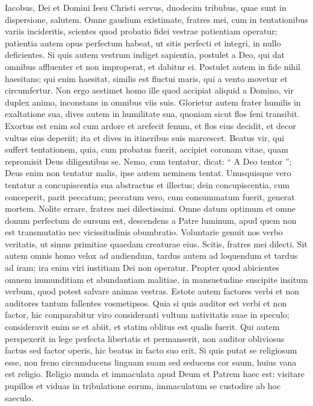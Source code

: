 \begin{biblechapter}
 \verse Iacobus, Dei et Domini Iesu Christi servus, duodecim tribubus, quae sunt in dispersione, salutem.
 \verse Omne gaudium existimate, fratres mei, cum in tentationibus variis incideritis, 
\verse scientes quod probatio fidei vestrae patientiam operatur; 
\verse patientia autem opus perfectum habeat, ut sitis perfecti et integri, in nullo deficientes.
 \verse Si quis autem vestrum indiget sapientia, postulet a Deo, qui dat omnibus affluenter et non improperat, et dabitur ei. 
\verse Postulet autem in fide nihil haesitans; qui enim haesitat, similis est fluctui maris, qui a vento movetur et circumfertur. 
\verse Non ergo aestimet homo ille quod accipiat aliquid a Domino, 
 \verse vir duplex animo, inconstans in omnibus viis suis.
 \verse Glorietur autem frater humilis in exaltatione sua, 
\verse dives autem in humilitate sua, quoniam sicut flos feni transibit. 
\verse Exortus est enim sol cum ardore et arefecit fenum, et flos eius decidit, et decor vultus eius deperiit; ita et dives in itineribus suis marcescet. 
\verse Beatus vir, qui suffert tentationem, quia, cum probatus fuerit, accipiet coronam vitae, quam repromisit Deus diligentibus se.
 \verse Nemo, cum tentatur, dicat: “ A Deo tentor ”; Deus enim non tentatur malis, ipse autem neminem tentat. 
\verse Unusquisque vero tentatur a concupiscentia sua abstractus et illectus; 
\verse dein concupiscentia, cum conceperit, parit peccatum; peccatum vero, cum consummatum fuerit, generat mortem.
 \verse Nolite errare, fratres mei dilectissimi. 
\verse Omne datum optimum et omne donum perfectum de sursum est, descendens a Patre luminum, apud quem non est transmutatio nec vicissitudinis obumbratio. 
\verse Voluntarie genuit nos verbo veritatis, ut simus primitiae quaedam creaturae eius. 
\verse Scitis, fratres mei dilecti. Sit autem omnis homo velox ad audiendum, tardus autem ad loquendum et tardus ad iram; 
\verse ira enim viri iustitiam Dei non operatur. 
\verse Propter quod abicientes omnem immunditiam et abundantiam malitiae, in mansuetudine suscipite insitum verbum, quod potest salvare animas vestras. 
\verse Estote autem factores verbi et non auditores tantum fallentes vosmetipsos. 
\verse Quia si quis auditor est verbi et non factor, hic comparabitur viro consideranti vultum nativitatis suae in speculo; 
\verse consideravit enim se et abiit, et statim oblitus est qualis fuerit. 
\verse Qui autem perspexerit in lege perfecta libertatis et permanserit, non auditor obliviosus factus sed factor operis, hic beatus in facto suo erit.
 \verse Si quis putat se religiosum esse, non freno circumducens linguam suam sed seducens cor suum, huius vana est religio. 
\verse Religio munda et immaculata apud Deum et Patrem haec est: visitare pupillos et viduas in tribulatione eorum, immaculatum se custodire ab hoc saeculo.
 

\end{biblechapter}
